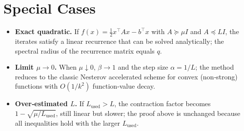 \documentclass{article}
\begin{document}
\section*{Special Cases}
\begin{itemize}[leftmargin=*]
\item \textbf{Exact quadratic.} If $f(x)=\frac{1}{2}x^{\top}Ax-b^{\top}x$ with $A\succeq \mu I$ and $A\preceq L I$, the iterates satisfy a linear recurrence that can be solved analytically; the spectral radius of the recurrence matrix equals $q$.
\item \textbf{Limit $\mu\to0$.} When $\mu\downarrow0$, $\beta\to1$ and the step size $\alpha=1/L$; the method reduces to the classic Nesterov accelerated scheme for convex (non‑strong) functions with $O(1/k^{2})$ function‑value decay.
\item \textbf{Over‑estimated $L$.} If $L_{\text{used}}>L$, the contraction factor becomes $1-\sqrt{\mu/L_{\text{used}}}$, still linear but slower; the proof above is unchanged because all inequalities hold with the larger $L_{\text{used}}$.
\end{itemize}
\end{document}
